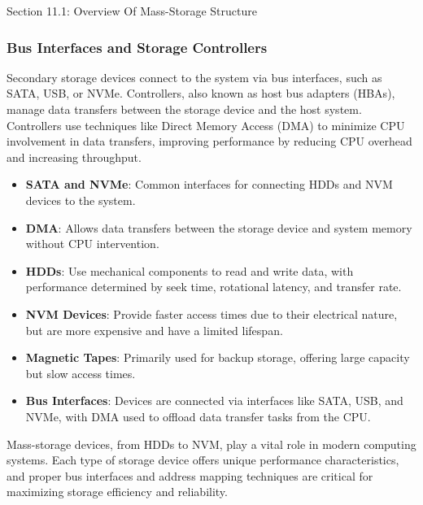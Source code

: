 \begin{notes}{Section 11.1: Overview Of Mass-Storage Structure}
\begin{highlight}
    \end{highlight}

    \subsubsection*{Bus Interfaces and Storage Controllers}
    
    Secondary storage devices connect to the system via bus interfaces, such as SATA, USB, or NVMe. Controllers, also known as host bus adapters (HBAs), manage data transfers between the storage device 
    and the host system. Controllers use techniques like Direct Memory Access (DMA) to minimize CPU involvement in data transfers, improving performance by reducing CPU overhead and increasing throughput.
    
    \begin{highlight}
    
        \begin{itemize}
            \item \textbf{SATA and NVMe}: Common interfaces for connecting HDDs and NVM devices to the system.
            \item \textbf{DMA}: Allows data transfers between the storage device and system memory without CPU intervention.
        \end{itemize}
    
    \end{highlight}
    
    \begin{highlight}
    
        \begin{itemize}
            \item \textbf{HDDs}: Use mechanical components to read and write data, with performance determined by seek time, rotational latency, and transfer rate.
            \item \textbf{NVM Devices}: Provide faster access times due to their electrical nature, but are more expensive and have a limited lifespan.
            \item \textbf{Magnetic Tapes}: Primarily used for backup storage, offering large capacity but slow access times.
            \item \textbf{Bus Interfaces}: Devices are connected via interfaces like SATA, USB, and NVMe, with DMA used to offload data transfer tasks from the CPU.
        \end{itemize}
    
    Mass-storage devices, from HDDs to NVM, play a vital role in modern computing systems. Each type of storage device offers unique performance characteristics, and proper bus interfaces and 
    address mapping techniques are critical for maximizing storage efficiency and reliability.
    
    \end{highlight}

\end{notes}


